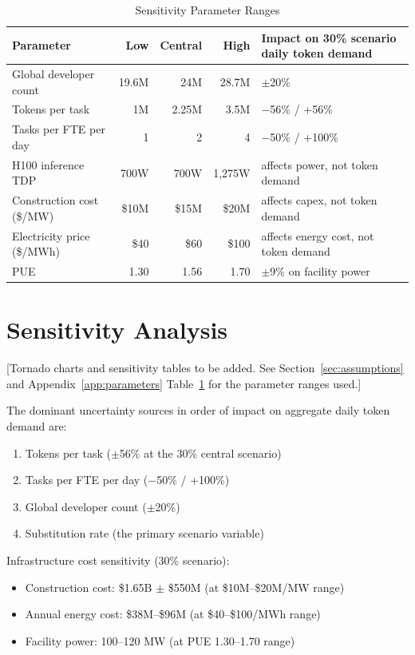 \documentclass{article}
\begin{document}
\begin{table}[ht]
\centering
\caption{Sensitivity Parameter Ranges}
\label{tab:sensitivity-params}
\small
\begin{tabular}{@{}p{4.5cm}rrr p{4.5cm}@{}}
\hline
\textbf{Parameter} & \textbf{Low} & \textbf{Central} & \textbf{High} & \textbf{Impact on 30\% scenario daily token demand} \\
\hline
Global developer count & 19.6M & 24M & 28.7M & $\pm$20\% \\
Tokens per task & 1M & 2.25M & 3.5M & $-$56\% / +56\% \\
Tasks per FTE per day & 1 & 2 & 4 & $-$50\% / +100\% \\
H100 inference TDP & 700W & 700W & 1,275W & affects power, not token demand \\
Construction cost (\$/MW) & \$10M & \$15M & \$20M & affects capex, not token demand \\
Electricity price (\$/MWh) & \$40 & \$60 & \$100 & affects energy cost, not token demand \\
PUE & 1.30 & 1.56 & 1.70 & $\pm$9\% on facility power \\
\hline
\end{tabular}
\end{table}

\section{Sensitivity Analysis}
\label{app:sensitivity}

[Tornado charts and sensitivity tables to be added. See Section~\ref{sec:assumptions}
and Appendix~\ref{app:parameters} Table~\ref{tab:sensitivity-params} for the parameter
ranges used.]

The dominant uncertainty sources in order of impact on aggregate daily token demand are:
\begin{enumerate}
  \item Tokens per task ($\pm$56\% at the 30\% central scenario)
  \item Tasks per FTE per day ($-$50\% / +100\%)
  \item Global developer count ($\pm$20\%)
  \item Substitution rate (the primary scenario variable)
\end{enumerate}

Infrastructure cost sensitivity (30\% scenario):
\begin{itemize}
  \item Construction cost: \$1.65B $\pm$ \$550M (at \$10M--\$20M/MW range)
  \item Annual energy cost: \$38M--\$96M (at \$40--\$100/MWh range)
  \item Facility power: 100--120 MW (at PUE 1.30--1.70 range)
\end{itemize}
\end{document}
